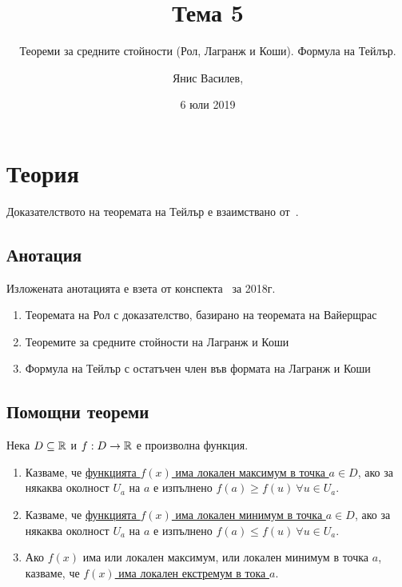 \documentclass[numbers=endperiod, DIV=15, bibliography=totocnumbered]{scrartcl}
\title{Тема 5}
\subtitle{Теореми за средните стойности (Рол, Лагранж и Коши). Формула на Тейлър.}
\author{Янис Василев, \Email{ianis@ivasilev.net}}
\date{6 юли 2019}
\begin{document}
\maketitle

\section{Теория}

Доказателството на теоремата на Тейлър е взаимствано от~\cite{Fichtenholz}.

\subsection{Анотация}

Изложената анотацията е взета от конспекта~\cite{Syllabus} за 2018г.

\begin{enumerate}
  \item Теоремата на Рол с доказателство, базирано на теоремата на Вайерщрас
  \item Теоремите за средните стойности на Лагранж и Коши
  \item Формула на Тейлър с остатъчен член във формата на Лагранж и Коши
\end{enumerate}

\subsection{Помощни теореми}

\begin{definition}
  Нека $D \subseteq \mathbb{R}$ и $f: D \to \mathbb{R}$ е произволна функция.

  \begin{enumerate}
    \item Казваме, че \uline{функцията $f(x)$ има локален максимум в точка $a \in D$}, ако за някаква околност $U_a$ на $a$ е изпълнено $f(a) \geq f(u)~\forall u \in U_a$.

    \item Казваме, че \uline{функцията $f(x)$ има локален минимум в точка $a \in D$}, ако за някаква околност $U_a$ на $a$ е изпълнено $f(a) \leq f(u)~\forall u \in U_a$.

    \item Ако $f(x)$ има или локален максимум, или локален минимум в точка $a$, казваме, че \uline{$f(x)$ има локален екстремум в тока $a$}.
  \end{enumerate}
\end{definition}
\end{document}
